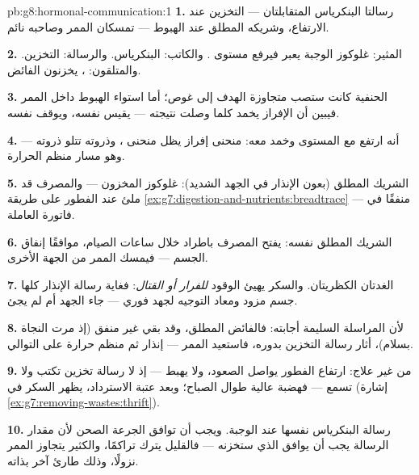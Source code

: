 \begin{solution}{pb:g8:hormonal-communication:1}
\textbf{1.} رسالتا البنكرياس المتقابلتان --- 
التخزين عند الارتفاع، وشريكه المطلق عند الهبوط ---
تمسكان الممر  وصاحبه نائم.

\textbf{2.} المثير: غلوكوز الوجبة يعبر  فيرفع
مستوى . والكاتب: البنكرياس. والرسالة:  التخزين.
والمتلقون:  ، يخزنون الفائض.

\textbf{3.} الحنفية كانت ستصب متجاوزة الهدف إلى غوص؛
أما استواء الهبوط داخل الممر فيبين أن الإفراز يخمد كلما
وصلت نتيجته --- يقيس نفسه، ويوقف نفسه.

\textbf{4.} أنه ارتفع مع المستوى وخمد معه: منحنى إفراز
يظل منحنى ، وذروته تتلو ذروته --- وهو مسار منظم
الحرارة.

\textbf{5.} الشريك المطلق (بعون  الإنذار في الجهد
الشديد): غلوكوز  المخزون --- والمصرف قد ملئ عند
الفطور على طريقة
\cref{ex:g7:digestion-and-nutrients:breadtrace} ---
منفقًا في فاتورة  العاملة.

\textbf{6.} الشريك المطلق نفسه: يفتح المصرف باطراد خلال
ساعات الصيام، موافقًا إنفاق الجسم --- فيمسك الممر من
الجهة الأخرى.

\textbf{7.} الغدتان الكظريتان. والسكر يهيئ الوقود
\emph{للفرار أو القتال}: فغاية رسالة الإنذار كلها جسم
مزود ومعاد التوجيه لجهد فوري --- جاء الجهد أم لم يجئ.

\textbf{8.} لأن المراسلة السليمة أجابته: فالفائض المطلق،
وقد بقي غير منفق (إذ مرت النجاة بسلام)، أثار رسالة
التخزين بدوره، فاستعيد الممر --- إنذار ثم منظم حرارة على
التوالي.

\textbf{9.} من غير علاج: ارتفاع الفطور يواصل الصعود،
ولا يهبط --- إذ لا رسالة تخزين تكتب ولا تسمع --- فهضبة
عالية طوال الصباح؛ وبعد عتبة الاسترداد، يظهر السكر في
 (إشارة \cref{ex:g7:removing-wastes:thrift}).

\textbf{10.} رسالة البنكرياس نفسها عند الوجبة. ويجب أن
توافق الجرعة الصحن لأن مقدار الرسالة يجب أن يوافق
 الذي ستخزنه --- فالقليل يترك تراكمًا، والكثير
يتجاوز الممر نزولًا، وذلك طارئ آخر بذاته.


\end{solution}
